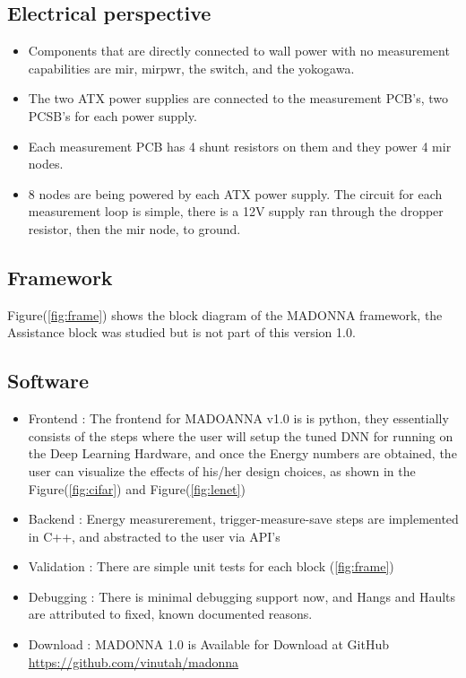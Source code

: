 \documentclass[letterpaper, 10 pt, conference]{ieeeconf}
\begin{document}
\subsection{Electrical perspective}

\begin{itemize}
  \item Components that are directly connected to wall power with no measurement capabilities are mir, mirpwr, the switch, and the yokogawa.

  \item The two ATX power supplies are connected to the measurement PCB's, two PCSB's for each power supply. 
  \item Each measurement PCB has 4 shunt resistors on them and they power 4 mir nodes. 
  \item 8 nodes are being powered by each ATX power supply. The circuit for each measurement loop is simple, 
        there is a 12V supply ran through the dropper resistor, then the mir node, to ground.

\end{itemize}
\subsection{Framework}

Figure(\ref{fig:frame}) shows the block diagram of the MADONNA framework, the Assistance
block was studied but is not part of this version 1.0.

\subsection{Software}

\begin{itemize}
  \item Frontend   : The frontend for MADOANNA v1.0 is is python, they essentially consists of the steps where the user
        will setup the tuned DNN for running on the Deep Learning Hardware, and once the Energy numbers are obtained, 
        the user can visualize the effects of his/her design choices, as shown in the Figure(\ref{fig:cifar}) and Figure(\ref{fig:lenet})
  \item Backend    : Energy measurerement, trigger-measure-save steps are implemented in C++, and abstracted to the user via API's
  \item Validation : There are simple unit tests for each block (\ref{fig:frame})
  \item Debugging  : There is minimal debugging support now, and Hangs and Haults are attributed to fixed, known documented reasons.
  \item Download   : MADONNA 1.0 is Available for Download at GitHub \url{https://github.com/vinutah/madonna}

  \end{itemize}
\end{document}

